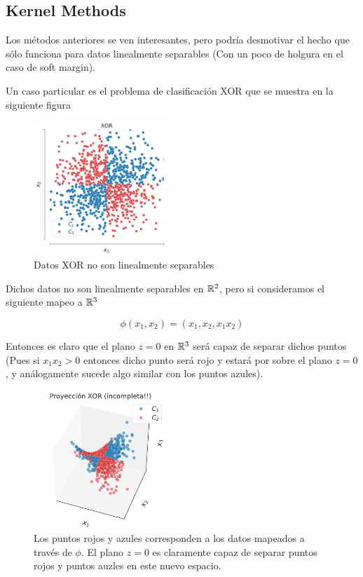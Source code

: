 \subsection{Kernel Methods}

Los métodos anteriores se ven interesantes, pero podría desmotivar el hecho que sólo funciona para datos linealmente separables (Con un poco de holgura en el caso de soft margin). 

Un caso particular es el problema de clasificación XOR que se muestra en la siguiente figura

\begin{figure}[ht]
    \centering
    \includegraphics[width=0.45\textwidth]{img/cap5_xor}
    \caption{Datos XOR no son linealmente separables}
    \label{fig:my_label5}
\end{figure}

Dichos datos no son linealmente separables en ${\mathbb R}^2$, pero si consideramos el siguiente mapeo a ${\mathbb R}^3$

\begin{equation}
    \phi(x_1, x_2) = (x_1, x_2, x_1 x_2)
\end{equation}

Entonces es claro que el plano $z=0$ en ${\mathbb R}^3$ será capaz de separar dichos puntos (Pues si $x_1 x_2 > 0$ entonces dicho punto será rojo y estará por sobre el plano $z=0$, y análogamente sucede algo similar con los puntos azules). 

\begin{figure}[ht]
    \centering
    \includegraphics[width=0.45\textwidth]{img/cap5_xor_3d_proyeccion}
    \caption{Los puntos rojos y azules corresponden a los datos mapeados a través de $\phi$. El plano $z=0$ es claramente capaz de separar puntos rojos y puntos auzles en este nuevo espacio.}
    \label{fig:my_label6}
\end{figure}

